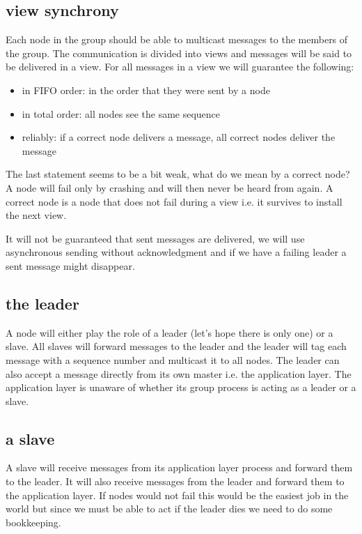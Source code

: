 \documentclass[a4paper,11pt]{article}
\begin{document}
\subsection{view synchrony}

Each node in the group should be able to multicast messages to the
members of the group. The communication is divided into views and
messages will be said to be delivered in a view. For all messages in a
view we will guarantee the following:

\begin{itemize}
\item in FIFO order: in the order that they were sent by a node
\item in total order: all nodes see the same sequence
\item reliably: if a correct node delivers a message, all correct nodes deliver the message
\end{itemize}

The last statement seems to be a bit weak, what do we mean
by a correct node? A node will fail only by crashing and will then
never be heard from again. A correct node is a node that does not fail
during a view i.e. it survives to install the next view.

It will not be guaranteed that sent messages are delivered, we will
use asynchronous sending without acknowledgment and if we have a
failing leader a sent message might disappear.

\subsection{the leader}

A node will either play the role of a leader (let's hope there is only
one) or a slave. All slaves will forward messages to the leader and
the leader will tag each message with a sequence number and multicast
it to all nodes. The leader can also accept a message directly from
its own master i.e. the application layer. The application layer is
unaware of whether its group process is acting as a leader or a slave.

\subsection{a slave}

A slave will receive messages from its application layer process and
forward them to the leader. It will also receive messages from the
leader and forward them to the application layer. If nodes would not
fail this would be the easiest job in the world but since we must be
able to act if the leader dies we need to do some bookkeeping.
\end{document}

